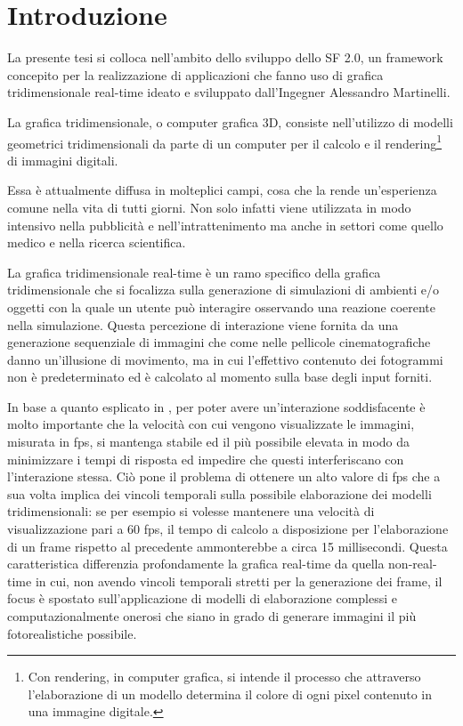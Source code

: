 
\chapter{Introduzione}
\label{ch:introduzione}
La presente tesi si colloca nell'ambito dello sviluppo dello \ac{SF} 2.0, un framework concepito per la realizzazione di applicazioni che fanno uso di grafica tridimensionale real-time ideato e sviluppato dall'Ingegner Alessandro Martinelli.

La grafica tridimensionale, o computer grafica 3D, consiste nell'utilizzo di modelli geometrici tridimensionali da parte di un computer per il calcolo e il rendering\footnote{Con rendering, in computer grafica, si intende il processo che attraverso l'elaborazione di un modello determina il colore di ogni pixel contenuto in una immagine digitale\cite{wiki:rendering-it,wiki:rendering-en}.} di immagini digitali.

Essa \`e attualmente diffusa in molteplici campi, cosa che la rende un'esperienza comune nella vita di tutti giorni. Non solo infatti viene utilizzata in modo intensivo nella pubblicit\`a e nell'intrattenimento ma anche in settori come quello medico e nella ricerca scientifica.

La grafica tridimensionale real-time \`e un ramo specifico della grafica tridimensionale che si focalizza sulla generazione di simulazioni di ambienti e/o oggetti con la quale un utente pu\`o interagire osservando una reazione coerente nella simulazione. Questa percezione di interazione viene fornita da una generazione sequenziale di immagini che come nelle pellicole cinematografiche danno un'illusione di movimento, ma in cui l'effettivo contenuto dei fotogrammi non \`e predeterminato ed \`e calcolato al momento sulla base degli input forniti.

In base a quanto esplicato in \cite{book:realtimerendering}, per poter avere un'interazione soddisfacente \`e molto importante che la velocit\`a con cui vengono visualizzate le immagini, misurata in \ac{fps}, si mantenga stabile ed il pi\`u possibile elevata in modo da minimizzare i tempi di risposta ed impedire che questi interferiscano con l'interazione stessa.
Ci\`o pone il problema di ottenere un alto valore di \ac{fps} che a sua volta implica dei vincoli temporali sulla possibile elaborazione dei modelli tridimensionali: se per esempio si volesse mantenere una velocit\`a di visualizzazione pari a 60 \ac{fps}, il tempo di calcolo a disposizione per l'elaborazione di un frame rispetto al precedente ammonterebbe a circa 15 millisecondi.
Questa caratteristica differenzia profondamente la grafica real-time da quella non-real-time in cui, non avendo vincoli temporali stretti per la generazione dei frame, il focus \`e spostato sull'applicazione di modelli di elaborazione complessi e computazionalmente onerosi che siano in grado di generare immagini il pi\`u fotorealistiche possibile. 

